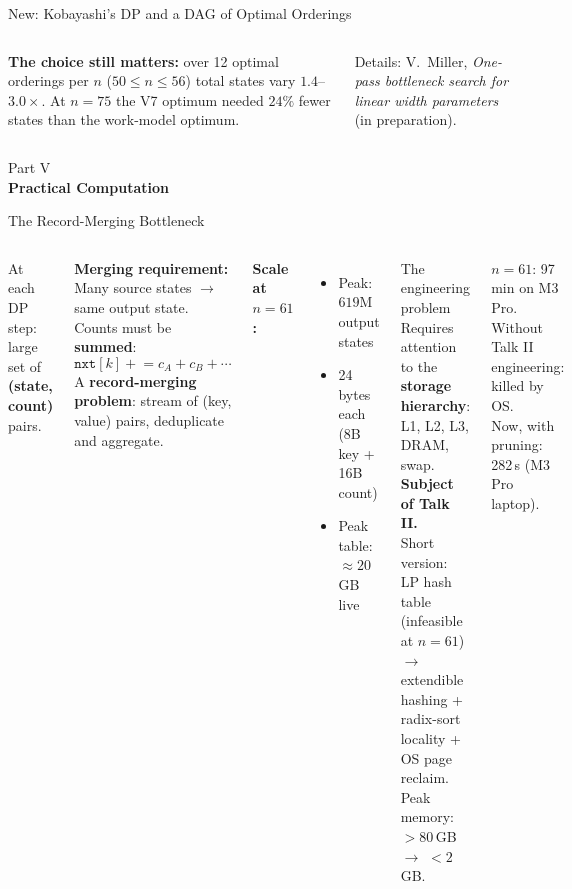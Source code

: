 \documentclass[aspectratio=169,t]{beamer}
\begin{document}
\begin{frame}{New: Kobayashi's DP and a DAG of Optimal Orderings}
\begin{columns}[t]
\vspace{0.05cm}
\textbf{The choice still matters:} over 12 optimal orderings per $n$
($50\le n\le56$) total states vary $1.4$--$3.0\times$. At $n=75$ the V7
optimum needed $24\%$ fewer states than the work-model optimum.

\vspace{0.05cm}
{\tiny Details: V.~Miller, \emph{One-pass bottleneck search for
linear width parameters} (in preparation).}
\end{columns}
\end{frame}

{
\begin{frame}[plain]
  \vspace{2cm}
  \begin{center}
    {\color{lightblue}\small Part V}\\[0.4cm]
    {\color{white}\LARGE\bfseries Practical Computation}
  \end{center}
\end{frame}
}

\begin{frame}{The Record-Merging Bottleneck}
\small
\begin{columns}[c]
At each DP step: large set of \textbf{(state, count)} pairs.

\vspace{0.15cm}
\textbf{Merging requirement:}\\
Many source states $\to$ same output state.
Counts must be \textbf{summed}:
\[
  \texttt{nxt}[k] \mathrel{+}= c_A + c_B + \cdots
\]
A \textbf{record-merging problem}: stream of (key, value) pairs,
deduplicate and aggregate.

\vspace{0.15cm}
\textbf{Scale at $n=61$:}
\begin{itemize}
  \item Peak: $619$M output states
  \item 24 bytes each (8B key + 16B count)
  \item Peak table: $\approx 20$\,GB live
\end{itemize}

\begin{alertblock}{The engineering problem}
  Requires attention to the \textbf{storage hierarchy}:
  L1, L2, L3, DRAM, swap.\\[3pt]
  \textbf{Subject of Talk II.}\\[3pt]
  Short version: LP hash table (infeasible at $n=61$)
  $\to$ extendible hashing + radix-sort locality +
  OS page reclaim. Peak memory: $>80$\,GB $\to$ $<2$\,GB.
\end{alertblock}

\vspace{0.15cm}
{\small $n=61$: 97\,min on M3 Pro.
Without Talk II engineering: killed by OS.\\
Now, with pruning: 282\,s (M3 Pro laptop).}
\end{columns}
\end{frame}
\end{document}
